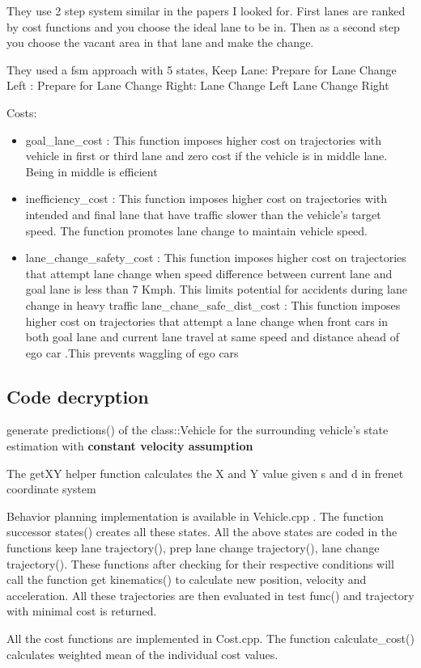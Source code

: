 \documentclass{article}
\begin{document}
  They use 2 step system similar in the papers I looked for. 
  First lanes are ranked by cost functions and you choose the ideal lane to be in. 
  Then as a second step you choose the vacant area in that lane and make the change. 
  
  They used a fsm approach with 5 states,
      Keep Lane: 
    Prepare for Lane Change Left :
    Prepare for Lane Change Right: 
    Lane Change Left 
    Lane Change Right 
    
    Costs:
    \begin{itemize}
    \item goal\_lane\_cost : This function imposes higher cost on trajectories with vehicle in first or third lane and zero cost if the vehicle is in middle lane. Being in middle is efficient
    \item inefficiency\_cost : This function imposes higher cost on trajectories with intended and final lane that have traffic slower than the vehicle’s target speed. The function promotes lane change to maintain vehicle speed.
    \item lane\_change\_safety\_cost : This function imposes higher cost on trajectories that attempt lane change when speed difference between current lane and goal lane is less than 7 Kmph. This limits potential for accidents during lane change in heavy traffic
    lane\_chane\_safe\_dist\_cost : This function imposes higher cost on trajectories that attempt a lane change when front cars in both goal lane and current lane travel at same speed and distance ahead of ego car .This prevents waggling of ego cars
    \end{itemize}
    
  \subsection{Code decryption}
  generate predictions() of the class::Vehicle for the surrounding vehicle's state estimation with \textbf{constant velocity assumption} 
  
  The getXY helper function calculates the X and Y value given s and d in frenet coordinate system
  
  Behavior planning implementation is available in Vehicle.cpp . The function successor states() creates all these states. All the above states are coded in the functions keep lane trajectory(), prep lane change trajectory(), lane change trajectory(). These functions after checking for their respective conditions will call the function get kinematics() to calculate new position, velocity and acceleration. All these trajectories are then evaluated in test func() and trajectory with minimal cost is returned.
  
  All the cost functions are implemented in Cost.cpp. The function calculate\_cost() calculates weighted mean of the individual cost values.
  
\end{document}
